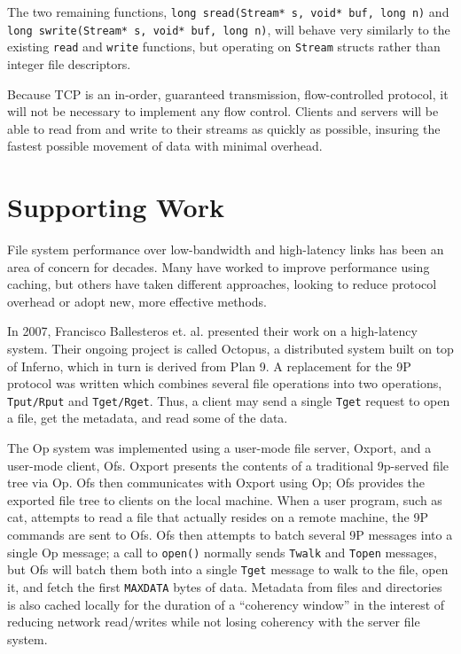 \documentclass[12pt,american]{report}
\begin{document}
The two remaining functions, {\tt long sread(Stream* s, void* buf, long n)} and {\tt long swrite(Stream* s, void* buf, long n)}, will behave very similarly to the existing {\tt read} and {\tt write} functions, but operating on {\tt Stream} structs rather than integer file descriptors.

Because TCP is an in-order, guaranteed transmission, flow-controlled protocol, it will not be necessary to implement any flow control. Clients and servers will be able to read from and write to their streams as quickly as possible, insuring the fastest possible movement of data with minimal overhead.

\section{Supporting Work}
File system performance over low-bandwidth and high-latency links has been an area of concern for decades. Many have worked to improve performance using caching, but others have taken different approaches, looking to reduce protocol overhead or adopt new, more effective methods.

In 2007, Francisco Ballesteros et. al.\cite{Op} presented their work on a high-latency system. Their ongoing project is called Octopus, a distributed system built on top of Inferno, which in turn is derived from Plan 9. A replacement for the 9P protocol was written which combines several file operations into two operations, {\tt Tput/Rput} and {\tt Tget/Rget}. Thus, a client may send a single {\tt Tget} request to open a file, get the metadata, and read some of the data.

The Op system was implemented using a user-mode file server, Oxport, and a user-mode client, Ofs. Oxport presents the contents of a traditional 9p-served file tree via Op. Ofs then communicates with Oxport using Op; Ofs provides the exported file tree to clients on the local machine. When a user program, such as cat, attempts to read a file that actually resides on a remote machine, the 9P commands are sent to Ofs. Ofs then attempts to batch several 9P messages into a single Op message; a call to {\tt open()} normally sends {\tt Twalk} and {\tt Topen} messages, but Ofs will batch them both into a single {\tt Tget} message to walk to the file, open it, and fetch the first {\tt MAXDATA} bytes of data. Metadata from files and directories is also cached locally for the duration of a ``coherency window'' in the interest of reducing network read/writes while not losing coherency with the server file system.
\end{document}
